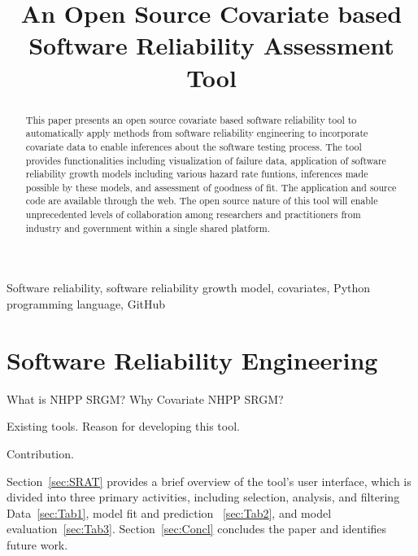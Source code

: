 \documentclass[conference]{IEEEtran}
\begin{document}
\title{An Open Source Covariate based Software Reliability Assessment Tool}

\author{
}

\maketitle

\begin{abstract}%
This paper presents an open source covariate based software reliability tool to automatically apply methods from software reliability engineering to incorporate covariate data to enable inferences about the software testing process. The tool provides functionalities including visualization of failure data, application of software reliability growth models including various hazard rate funtions, inferences made possible by these models, and assessment of goodness of fit. The application and source code are available through the web. The open source nature of this tool will enable unprecedented levels of collaboration among researchers and practitioners from industry and government within a single shared platform.
\end{abstract}

\begin{IEEEkeywords}
Software reliability, software reliability growth model, covariates, Python programming language, GitHub
\end{IEEEkeywords}


\section{Software Reliability Engineering}
What is NHPP SRGM? Why Covariate NHPP SRGM?

Existing tools. Reason for developing this tool.

Contribution.


Section~\ref{sec:SRAT} provides a brief overview of the tool's user interface, which is divided into three primary activities, including selection, analysis, and filtering Data~\ref{sec:Tab1}, model fit and prediction ~\ref{sec:Tab2}, and model evaluation~\ref{sec:Tab3}. Section~\ref{sec:Concl} concludes the paper and identifies future work.
\end{document}
